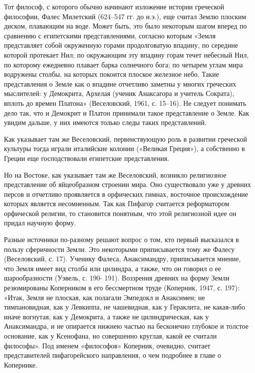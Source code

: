 Тот философ,  с которого  обычно начинают изложение  истории греческой
философии, Фалес  Милетский (624--547 гг.  до н.э.), еще  считал Землю
плоским  диском, плавающим  на воде.  Может быть,  это было  некоторым
шагом  вперед по  сравнению  с  египетскими представлениями,  согласно
которым  «Земля  представляет  собой окруженную  горами  продолговатую
впадину, по середине которой протекает  Нил; по окружающим эту впадину
горам  течет  небесный  Нил,   по  которому  ежедневно  плавает  барка
солнечного бога;  по четырем углам  мира водружены столбы,  на которых
покоится  плоское железное  небо. Такие  представления о  Земле как  о
впадине отчетливо заметны у  многих греческих мыслителей: у Демокрита,
Архелая  (ученик  Анаксагора  и  учитель Сократа),  вплоть  до  времен
Платона» (Веселовский, 1961, с. 15--16). Не следует понимать дело так,
что и  Демокрит и  Платон принимали такое  представление о  Земле. Как
увидим дальше, у них имеются только следы таких представлений.

Как  указывает  там же  Веселовский,  первенствующую  роль в  развитии
греческой культуры тогда играли италийские колонии («Великая Греция»),
а собственно в Греции еще господствовали египетские представления.

Но на Востоке, как указывает  там же Веселовский, возникло религиозное
представление об  яйцеобразном строении  мира. Оно существовало  уже у
древних персов и отчетливо  проявляется в орфических гимнах, восточное
происхождение которых является несомненным.  Так как Пифагор считается
реформатором  орфической религии,  то  становится  понятным, что  этой
религиозной идее он придал научную форму.

Разные  источники   по-разному  решают   вопрос  о  том,   кто  первый
высказался в  пользу сферичности  Земли. Это  некоторыми приписывается
тому  же Фалесу  (Веселовский, с.  17). Ученику  Фалеса, Анаксимандру,
приписывается  мнение, что  Земля  имеет вид  столба  или цилиндра,  а
также,  что он  говорил о  ее  шарообразности (Уэвель,  с. 190-  191).
Воззрения  древних  на  форму  Земли  резюмированы  Коперником  в  его
бессмертном труде (Коперник,  1947, с. 197): «Итак,  Земля не плоская,
как полагали Эмпедокл  и Анаксимен; не тимпановидная,  как у Левкиппа,
не чашевидная,  как у Гераклита,  не какая-либо иначе вогнутая,  как у
Демокрита,  а  также  не  цилиндрическая, как  у  Анаксимандра,  и  не
опирается нижнею  частью на  бесконечно глубокое и  толстое основание,
как у  Ксенофана, но совершенно  круглая, какой ее  считали философы».
Под  именем  «философов»  Коперник, очевидно,  считает  представителей
пифагорейского направления, о чем подробнее в главе о Копернике.

